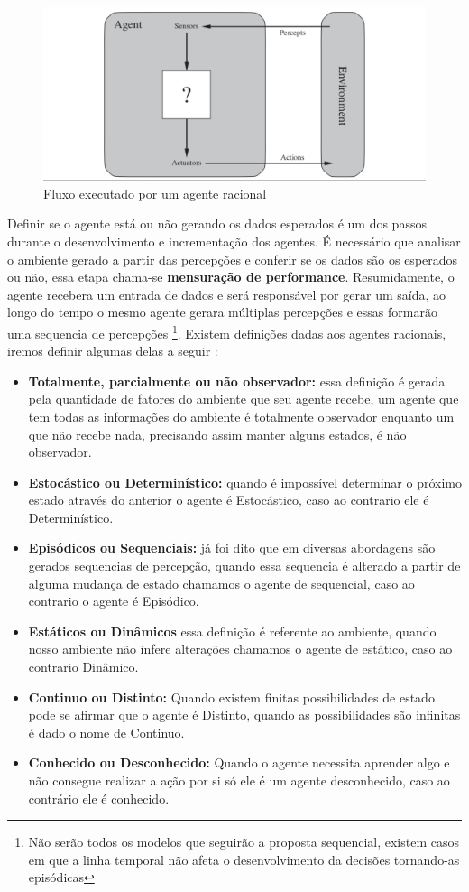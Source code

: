 \begin{figure}
    \centering
    \includegraphics[width=.8\textwidth]{imagens/rational_agent_draw.png}
    \caption{Fluxo executado por um agente racional}
    \label{fig:rational_agent_draw}
\end{figure}

Definir se o agente está ou não gerando os dados esperados é um dos passos durante o desenvolvimento e incrementação dos agentes. É necessário que analisar o ambiente gerado a partir das percepções e conferir se os dados são os esperados ou não, essa etapa chama-se \textbf{mensuração de performance}. Resumidamente, o agente recebera um entrada de dados e será responsável por gerar um saída, ao longo do tempo o mesmo agente gerara múltiplas percepções e essas formarão uma sequencia de percepções \footnote{Não serão todos os modelos que seguirão a proposta sequencial, existem casos em que a linha temporal não afeta o desenvolvimento da decisões tornando-as episódicas}. Existem definições dadas aos agentes racionais, iremos definir algumas delas a seguir \cite[34-45]{russell2003artificial}:

\begin{itemize}
 \item \textbf{Totalmente, parcialmente ou não observador:} essa definição é gerada pela quantidade de fatores do ambiente que seu agente recebe, um agente que tem todas as informações do ambiente é totalmente observador enquanto um que não recebe nada, precisando assim manter alguns estados, é não observador.
 \item \textbf{Estocástico ou Determinístico:} quando é impossível determinar o próximo estado através do anterior o agente é Estocástico, caso ao contrario ele é Determinístico.
 \item \textbf{Episódicos ou Sequenciais:} já foi dito que em diversas abordagens são gerados sequencias de percepção, quando essa sequencia é alterado a partir de alguma mudança de estado chamamos o agente de sequencial, caso ao contrario o agente é Episódico.
 \item \textbf{Estáticos ou Dinâmicos} essa definição é referente ao ambiente, quando nosso ambiente não infere alterações chamamos o agente de estático, caso ao contrario Dinâmico.
 \item \textbf{Continuo ou Distinto:} Quando existem finitas possibilidades de estado pode se afirmar que o agente é Distinto, quando as possibilidades são infinitas é dado o nome de Continuo.
 \item \textbf{Conhecido ou Desconhecido:} Quando o agente necessita aprender algo e não consegue realizar a ação por si só ele é um agente desconhecido, caso ao contrário ele é conhecido.
\end{itemize}
